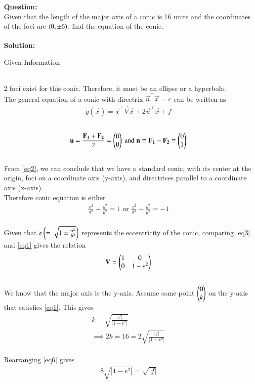 \documentclass[journal]{IEEEtran}
\begin{document}
\textbf{Question:}\\
Given that the length of the major axis of a conic is 16 units and the coordinates of the foci are $\left(0,\pm6\right)$, find the equation of the conic.
\\ \\
\textbf{Solution:} \\
\begin{table}[h!]
  \centering
  
  \caption{Given Information}
  \label{Table 1}
\end{table} \\
2 foci exist for this conic. Therefore, it must be an ellipse or a hyperbola.
\\
The general equation of a conic with directrix $\vec{n}^\top\vec{x}=c$ can be written as 
\begin{align}
g(\vec{x}) = \vec{x}^\top\vec{V}\vec{x}+2\vec{u}^\top\vec{x}+f \label{eq1}
\end{align}
\\
\begin{align}
\mathbf{u} =\frac{\mathbf{F_1}+\mathbf{F_2}}{2}=\begin{pmatrix}0\\0\end{pmatrix} \text{ and } \mathbf{n}\equiv\mathbf{F_1}-\mathbf{F_2}\equiv\begin{pmatrix}0\\1\end{pmatrix} \label{eq2}
\end{align}
\\
From \eqref{eq2}, we can conclude that we have a standard conic, with its center at the origin, foci on a coordinate axis (y-axis), and directrices parallel to a coordinate axis (x-axis).
\\
Therefore conic equation is either 
\begin{align}
\frac{x^2}{a^2} + \frac{y^2}{b^2} = 1 \text{ or } \frac{x^2}{a^2} - \frac{y^2}{b^2} = -1 \label{eq3}
\end{align}
\\
Given that $e \left(=\sqrt{1\pm\frac{a^2}{b^2}}\right)$ represents the eccentricity of the conic, comparing \eqref{eq3} and \eqref{eq1} gives the relation
\begin{align}
\mathbf{V} = \begin{pmatrix}1&0\\0&1-e^2\end{pmatrix}
\end{align}
\\
We know that the major axis is the y-axis. Assume some point $\begin{pmatrix}0\\k\end{pmatrix}$ on the y-axis that satisfies \eqref{eq1}. This gives
\begin{align}
k = \sqrt{\frac{|f|}{|1-e^2|}}
\\
\implies 2k = 16 = 2\sqrt{\frac{|f|}{|1-e^2|}} \label{eq6}
\end{align}
\\
Rearranging \eqref{eq6} gives 
\begin{align}
8\sqrt{|1-e^2|}=\sqrt{|f|} \label{eq7}
\end{align}
\end{document}
